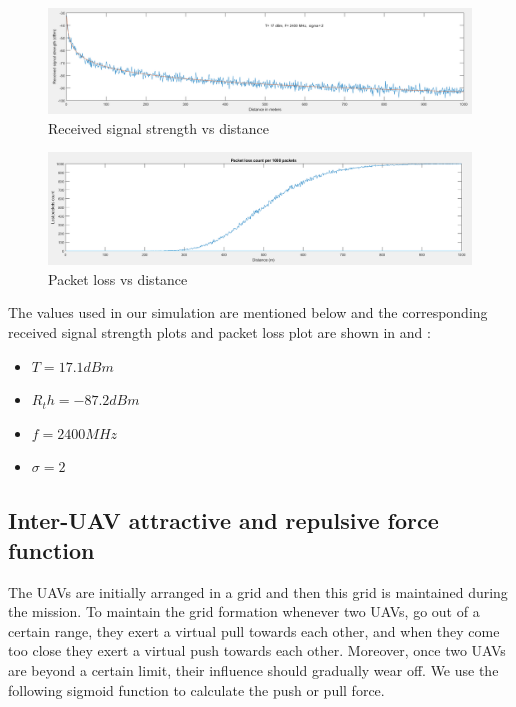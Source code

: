 \begin{figure}[hbtp]
\centering
\includegraphics[width=1\textwidth]{ncsuthesis-0.6/Chapter-4/figs/signal_strength}
\caption{Received signal strength vs distance}
\label{fig:signal_strength}
\end{figure}
\begin{figure}[hbtp]
\centering
\includegraphics[width=1\textwidth]{ncsuthesis-0.6/Chapter-4/figs/packet_loss}
\caption{Packet loss vs distance}
\label{fig:packet_loss}
\end{figure}
The values used in our simulation are mentioned below and the corresponding received signal strength plots and packet loss plot are shown in  and :
\begin{itemize}
    \item $T = 17.1  dBm $  
    \item $R_th = -87.2 dBm $
    \item $f = 2400 MHz $
    \item $ \sigma = 2 $ 
\end{itemize}

\subsection{Inter-UAV attractive and repulsive force function}
The UAVs are initially arranged in a grid and then this grid is maintained during the mission. To maintain the grid formation whenever two UAVs, go out of a certain range, they exert a virtual pull towards each other, and when they come too close they exert a virtual push towards each other. Moreover, once two UAVs are beyond a certain limit, their influence should gradually wear off. We use the following sigmoid function to calculate the push or pull force. 

